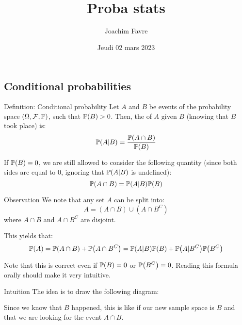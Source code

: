\documentclass[a4paper]{article}
\title{Proba stats}
\author{Joachim Favre}
\date{Jeudi 02 mars 2023}
\begin{document}
\maketitle


\subsection{Conditional probabilities}
\begin{parag}{Definition: Conditional probability}
    Let $A$ and $B$ be events of the probability space $\left(\Omega, \mathcal{F}, \prob\right)$, such that $\prob\left(B\right) > 0$. Then, the  of $A$ given $B$ (knowing that $B$ took place) is: 
    \[\prob\left(A | B\right) = \frac{\prob\left(A \cap B\right)}{\prob\left(B\right)}\]
    
    If $\prob\left(B\right) = 0$, we are still allowed to consider the following quantity (since both sides are equal to 0, ignoring that $\prob\left(A | B\right) $ is undefined):
    \[\prob\left(A \cap B\right) = \prob\left(A | B\right)\prob\left(B\right)\]

    \begin{subparag}{Observation}
        We note that any set $A$ can be split into: 
        \[A = \left(A \cap B\right) \cup \left(A \cap B^C\right)\]
        where $A \cap B$ and $A \cap B^C$ are disjoint.

        This yields that: 
        \[\prob\left(A\right) = \prob\left(A \cap B\right) + \prob\left(A \cap B^C\right) = \prob\left(A | B\right)\prob\left(B\right) + \prob\left(A | B^C\right)\prob\left(B^C\right)\]

        Note that this is correct even if $\prob\left(B\right) = 0$ or $\prob\left(B^C\right) = 0$. Reading this formula orally should make it very intuitive.
    \end{subparag}

    \begin{subparag}{Intuition}
        The idea is to draw the following diagram:

        Since we know that $B$ happened, this is like if our new sample space is $B$ and that we are looking for the event $A \cap B$.
    \end{subparag}
\end{parag}
\end{document}
